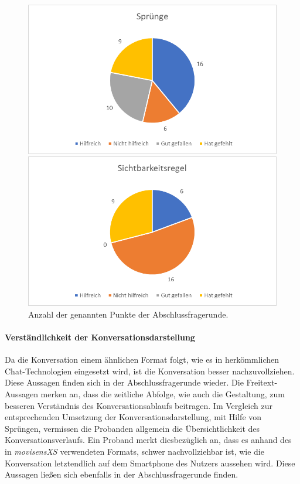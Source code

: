 \begin{figure}
   \begin{minipage}[b]{.49\linewidth} %
      \includegraphics[width=\linewidth]{pictures/diagramme/aussagenspr}
   \end{minipage}
   \hspace{.01\linewidth}%
   \begin{minipage}[b]{.49\linewidth} %
      \includegraphics[width=\linewidth]{pictures/diagramme/aussagensichtb}
   \end{minipage}
   \caption{Anzahl der genannten Punkte der Abschlussfragerunde.}
\end{figure}

\paragraph{Verständlichkeit der Konversationsdarstellung}
Da die Konversation einem ähnlichen Format folgt, wie es in herkömmlichen Chat-Technologien eingesetzt wird, ist die Konversation besser nachzuvollziehen. Diese Aussagen finden sich in der Abschlussfragerunde wieder. Die Freitext-Aussagen merken an, dass die zeitliche Abfolge, wie auch die Gestaltung, zum besseren Verständnis des Konversationsablaufs beitragen. Im Vergleich zur entsprechenden Umsetzung der Konversationsdarstellung, mit Hilfe von Sprüngen, vermissen die Probanden allgemein die Übersichtlichkeit des Konversationsverlaufs. Ein Proband merkt diesbezüglich an, dass es anhand des in \emph{movisensXS} verwendeten Formats, schwer nachvollziehbar ist, wie die Konversation letztendlich auf dem Smartphone des Nutzers aussehen wird. Diese Aussagen ließen sich ebenfalls in der Abschlussfragerunde finden. 

